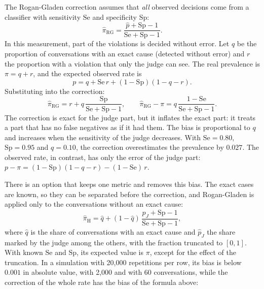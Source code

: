 \documentclass[11pt,a4paper]{article}
\begin{document}
The Rogan-Gladen correction assumes that \emph{all} observed decisions come from a classifier with sensitivity
$\mathrm{Se}$ and specificity $\mathrm{Sp}$:
\begin{equation}
  \hat{\pi}_{\mathrm{RG}} = \frac{\hat{p} + \mathrm{Sp} - 1}{\mathrm{Se} + \mathrm{Sp} - 1}.
\end{equation}
In this measurement, part of the violations is decided without error. Let $q$ be the proportion of conversations
with an exact cause (detected without error) and $r$ the proportion with a violation that only the judge can
see. The real prevalence is $\pi = q + r$, and the expected observed rate is
\begin{equation}
  p = q + \mathrm{Se}\, r + (1 - \mathrm{Sp})(1 - q - r).
\end{equation}
Substituting into the correction:
\begin{equation}
  \hat{\pi}_{\mathrm{RG}} = r + q\,\frac{\mathrm{Sp}}{\mathrm{Se} + \mathrm{Sp} - 1},
  \qquad
  \hat{\pi}_{\mathrm{RG}} - \pi = q\,\frac{1 - \mathrm{Se}}{\mathrm{Se} + \mathrm{Sp} - 1}.
\end{equation}
The correction is exact for the judge part, but it inflates the exact part: it treats a part that has no false
negatives as if it had them. The bias is proportional to $q$ and increases when the sensitivity of the judge
decreases. With $\mathrm{Se} = 0.80$, $\mathrm{Sp} = 0.95$ and $q = 0.10$, the correction overestimates the
prevalence by $0.027$. The observed rate, in contrast, has only the error of the judge part:
$p - \pi = (1 - \mathrm{Sp})(1 - q - r) - (1 - \mathrm{Se})\, r$.

There is an option that keeps one metric and removes this bias. The exact cases are known, so they can be
separated before the correction, and Rogan-Gladen is applied only to the conversations without an exact cause:
\begin{equation}
  \hat{\pi}_{\mathrm{H}} = \hat{q} + (1 - \hat{q})\,
  \frac{\hat{p}_J + \mathrm{Sp} - 1}{\mathrm{Se} + \mathrm{Sp} - 1},
\end{equation}
where $\hat{q}$ is the share of conversations with an exact cause and $\hat{p}_J$ the share marked by the judge
among the others, with the fraction truncated to $[0,1]$. With known $\mathrm{Se}$ and $\mathrm{Sp}$, its
expected value is $\pi$, except for the effect of the truncation. In a simulation with 20{,}000 repetitions per
row, its bias is below $0.001$ in absolute value, with 2{,}000 and with 60 conversations, while the correction of
the whole rate has the bias of the formula above:
\end{document}
